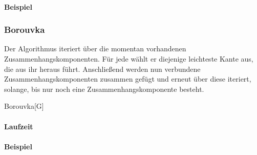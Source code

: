\paragraph{Beispiel}

\subsubsection{Borouvka}
\label{subsubsec:Borouvka}

Der Algorithmus iteriert über die momentan vorhandenen Zusammenhangskomponenten.
Für jede wählt er diejenige leichteste Kante aus, die aus ihr heraus führt.
Anschließend werden nun verbundene Zusammenhangskomponenten zusammen gefügt und erneut über diese iteriert,
solange, bis nur noch eine Zusammenhangskomponente besteht.

\begin{algorithm}{Borouvka}[G]{
	\qinput{}
	\qoutput{}
}
\end{algorithm}

\paragraph{Laufzeit}

\paragraph{Beispiel}
